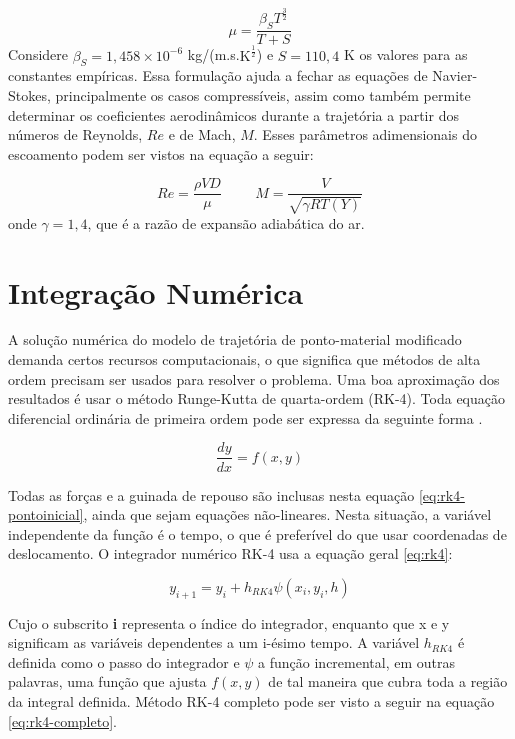 \begin{equation}
\label{eq:sutherICAO}
\mu = \frac{\beta_{S}T^{\frac{3}{2}}}{T + S}
\end{equation}
%
Considere $\beta_{S} = 1,458 \times 10^{-6}$ kg/(m.s.$\text{K}^{\frac{1}{2}}$) e $S = 110,4$ K os valores para as constantes empíricas. Essa formulação ajuda a fechar as equações de Navier-Stokes, principalmente os casos compressíveis, assim como também permite determinar os coeficientes aerodinâmicos durante a trajetória a partir dos números de Reynolds, $Re$ e de Mach, $M$. Esses parâmetros adimensionais do escoamento podem ser vistos na equação a seguir:

\begin{equation}
    Re = \frac{\rho V D}{\mu} \hspace{1cm}
    M = \frac{V}{\sqrt{\gamma RT(Y)}}
\end{equation}
%
onde $\gamma = 1,4$, que é a razão de expansão adiabática do ar.

\section{Integração Numérica}
\label{sec:numint}

A solução numérica do modelo de trajetória de ponto-material modificado demanda certos recursos computacionais, o que significa que métodos de alta ordem precisam ser usados para resolver o problema. Uma boa aproximação dos resultados é usar o método Runge-Kutta de quarta-ordem (RK-4). Toda equação diferencial ordinária de primeira ordem pode ser expressa da seguinte forma \cite{ruggiero1996calculo}.

\begin{equation}
    \label{eq:rk4-pontoinicial}
    \frac{dy}{dx} = f(x,y)
\end{equation}

Todas as forças e a guinada de repouso são inclusas nesta equação \ref{eq:rk4-pontoinicial}, ainda que sejam equações não-lineares. Nesta situação, a variável independente da função é o tempo, o que é preferível do que usar coordenadas de deslocamento. O integrador numérico RK-4 usa a equação geral \ref{eq:rk4}:

\begin{equation}
    \label{eq:rk4}
    y_{i+1} = y_{i} + h_{RK4}\psi(x_{i},y_{i},h)
\end{equation}

Cujo o subscrito \textbf{i} representa o índice do integrador, enquanto que x e y significam as variáveis dependentes a um i-ésimo tempo. A variável $h_{RK4}$ é definida como o passo do integrador e $\psi$ a função incremental, em outras palavras, uma função que ajusta $f(x,y)$ de tal maneira que cubra toda a região da integral definida. Método RK-4 completo pode ser visto a seguir na equação \ref{eq:rk4-completo}.

